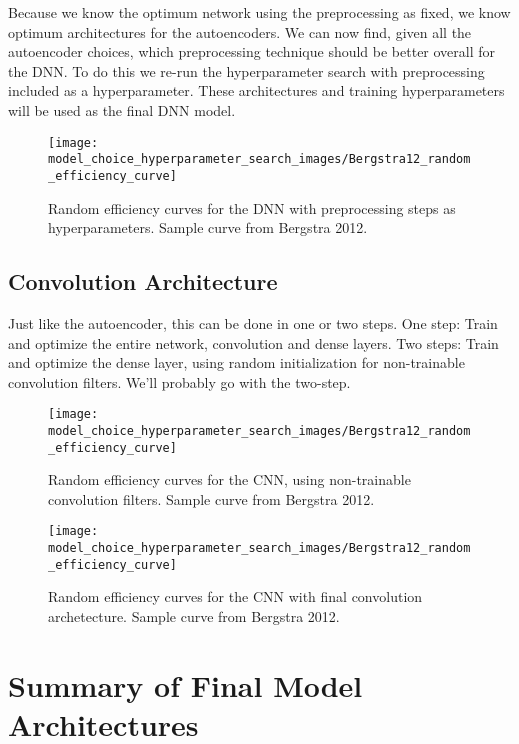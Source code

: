 Because we know the optimum network using the preprocessing as fixed, we know optimum architectures for the autoencoders. We can now find, given all the autoencoder choices, which preprocessing technique should be better overall for the DNN. To do this we re-run the hyperparameter search with preprocessing included as a hyperparameter. These architectures and training hyperparameters will be used as the final  DNN model.

\begin{figure}[H]
	\centering
	\texttt{[image: model\_choice\_hyperparameter\_search\_images/Bergstra12\_random\_efficiency\_curve]}
	\caption{Random efficiency curves for the DNN with preprocessing steps as hyperparameters. Sample curve from Bergstra 2012.}
	\label{fig:random_efficiency_curve_DNN}
\end{figure}



\subsection{Convolution Architecture}

Just like the autoencoder, this can be done in one or two steps. One step: Train and optimize the entire network, convolution and dense layers. Two steps: Train and optimize the dense layer, using random initialization for non-trainable convolution filters. We'll probably go with the two-step.


\begin{figure}[H]
	\centering
	\texttt{[image: model\_choice\_hyperparameter\_search\_images/Bergstra12\_random\_efficiency\_curve]}
	\caption{Random efficiency curves for the CNN, using non-trainable convolution filters. Sample curve from Bergstra 2012.}
	\label{fig:random_efficiency_curve_CAE}
\end{figure}




\begin{figure}[H]
	\centering
	\texttt{[image: model\_choice\_hyperparameter\_search\_images/Bergstra12\_random\_efficiency\_curve]}
	\caption{Random efficiency curves for the CNN with final convolution archetecture. Sample curve from Bergstra 2012.}
	\label{fig:random_efficiency_curve_CAE}
\end{figure}








\section{Summary of Final Model Architectures}

